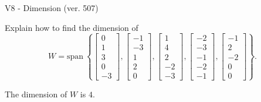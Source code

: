 \begin{exercise}
  \begin{exerciseTitle}V8 - Dimension (ver. 507)\end{exerciseTitle}
  \begin{exerciseStatement}
    Explain how to find the dimension of 
\[W=\mathrm{span}\ \left\{\left[\begin{array}{r}
0 \\
1 \\
3 \\
0 \\
-3
\end{array}\right] , \left[\begin{array}{r}
-1 \\
-3 \\
1 \\
2 \\
0
\end{array}\right] , \left[\begin{array}{r}
1 \\
4 \\
2 \\
-2 \\
-3
\end{array}\right] , \left[\begin{array}{r}
-2 \\
-3 \\
-1 \\
-2 \\
-1
\end{array}\right] , \left[\begin{array}{r}
-1 \\
2 \\
-2 \\
0 \\
0
\end{array}\right]\right\}.\]



  \end{exerciseStatement}
  \begin{exerciseAnswer}
   The dimension of \(W\) is  \(4\).
  


  \end{exerciseAnswer}
\end{exercise}